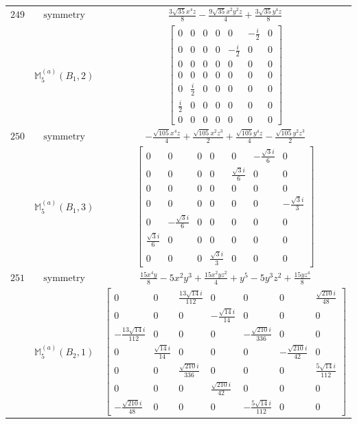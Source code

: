 \documentclass[fleqn,8pt,landscape]{jsarticle}
\begin{document}
\begin{longtable}{ccc}
$ 249 $ & $ \text{symmetry} $ & $ \frac{3 \sqrt{35} x^{4} z}{8} - \frac{9 \sqrt{35} x^{2} y^{2} z}{4} + \frac{3 \sqrt{35} y^{4} z}{8} $ \\
$  $ & $ \mathbb{M}_{5}^{(a)}(B_{1},2) $ & $ \begin{bmatrix} 0 & 0 & 0 & 0 & 0 & - \frac{i}{2} & 0 \\ 0 & 0 & 0 & 0 & - \frac{i}{2} & 0 & 0 \\ 0 & 0 & 0 & 0 & 0 & 0 & 0 \\ 0 & 0 & 0 & 0 & 0 & 0 & 0 \\ 0 & \frac{i}{2} & 0 & 0 & 0 & 0 & 0 \\ \frac{i}{2} & 0 & 0 & 0 & 0 & 0 & 0 \\ 0 & 0 & 0 & 0 & 0 & 0 & 0 \end{bmatrix} $ \\ \hline
$ 250 $ & $ \text{symmetry} $ & $ - \frac{\sqrt{105} x^{4} z}{4} + \frac{\sqrt{105} x^{2} z^{3}}{2} + \frac{\sqrt{105} y^{4} z}{4} - \frac{\sqrt{105} y^{2} z^{3}}{2} $ \\
$  $ & $ \mathbb{M}_{5}^{(a)}(B_{1},3) $ & $ \begin{bmatrix} 0 & 0 & 0 & 0 & 0 & - \frac{\sqrt{3} i}{6} & 0 \\ 0 & 0 & 0 & 0 & \frac{\sqrt{3} i}{6} & 0 & 0 \\ 0 & 0 & 0 & 0 & 0 & 0 & 0 \\ 0 & 0 & 0 & 0 & 0 & 0 & - \frac{\sqrt{3} i}{3} \\ 0 & - \frac{\sqrt{3} i}{6} & 0 & 0 & 0 & 0 & 0 \\ \frac{\sqrt{3} i}{6} & 0 & 0 & 0 & 0 & 0 & 0 \\ 0 & 0 & 0 & \frac{\sqrt{3} i}{3} & 0 & 0 & 0 \end{bmatrix} $ \\ \hline
$ 251 $ & $ \text{symmetry} $ & $ \frac{15 x^{4} y}{8} - 5 x^{2} y^{3} + \frac{15 x^{2} y z^{2}}{4} + y^{5} - 5 y^{3} z^{2} + \frac{15 y z^{4}}{8} $ \\
$  $ & $ \mathbb{M}_{5}^{(a)}(B_{2},1) $ & $ \begin{bmatrix} 0 & 0 & \frac{13 \sqrt{14} i}{112} & 0 & 0 & 0 & \frac{\sqrt{210} i}{48} \\ 0 & 0 & 0 & - \frac{\sqrt{14} i}{14} & 0 & 0 & 0 \\ - \frac{13 \sqrt{14} i}{112} & 0 & 0 & 0 & - \frac{\sqrt{210} i}{336} & 0 & 0 \\ 0 & \frac{\sqrt{14} i}{14} & 0 & 0 & 0 & - \frac{\sqrt{210} i}{42} & 0 \\ 0 & 0 & \frac{\sqrt{210} i}{336} & 0 & 0 & 0 & \frac{5 \sqrt{14} i}{112} \\ 0 & 0 & 0 & \frac{\sqrt{210} i}{42} & 0 & 0 & 0 \\ - \frac{\sqrt{210} i}{48} & 0 & 0 & 0 & - \frac{5 \sqrt{14} i}{112} & 0 & 0 \end{bmatrix} $ \\ \hline

\end{longtable}
\end{document}
